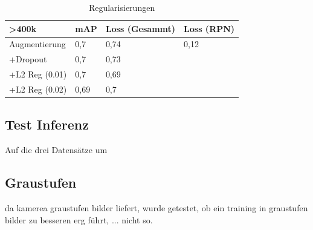 \begin{table}[htb]
  \centering
  \label{table:reg}
  \begin{tabular}{m{}|m{}<{\centering}m{}<{\centering}m{}<{\centering}}
  \hline
  \textgreater 400k & mAP  & Loss (Gesammt) & Loss (RPN) \\ \hline\hline
  Augmentierung     & 0,7  & 0,74           &  0,12          \\
  +Dropout          & 0,7  & 0,73           &            \\
  +L2 Reg (0.01)    & 0,7  & 0,69           &            \\
  +L2 Reg (0.02)    & 0,69 & 0,7            &            \\ \hline
  \end{tabular}
  \caption{Regularisierungen}
\end{table}

\subsection{Test Inferenz}

Auf die drei Datensätze um 


\subsection{Graustufen}
da kamerea graustufen bilder liefert, wurde getestet, ob ein 
training in graustufen bilder zu besseren erg führt, ... nicht so.








